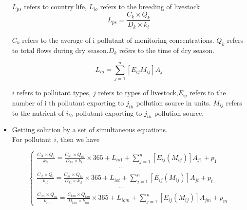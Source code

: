 \documentclass[12pt,a4paper]{article}
\begin{document}
\begin{itemize}
    $L_{ps}$ refers to country life, $L_{io}$ refers to the breeding of livestock
    \begin{equation}L_{ps}=\frac{C_k\times Q_k}{D_k\times k_i}\end{equation}
    
    $C_k$ refers to the average of i pollutant of monitoring concentrations. $Q_k$ refers to total flows during dry season.$D_k$ refers to the time of dry season.
    
    \begin{equation}L_{io}=\sum_{j=1}^{n}[E_{ij}M_{ij}]A_j\end{equation}
    
    $i$ refers to pollutant types, $j$ refers to types of livestock,$E_{ij}$ refers to the number of i th pollutant exporting to $j_{th}$ pollution source in units.
    $M_{ij}$ refers to the nutrient of $i_{th}$ pollutant exporting to $j_{th}$ pollution  source.
    
    \item Getting solution by a set of simultaneous equations.\\
    For pollutant $i$, then we have
    
    \begin{equation}
    \begin{cases}
    \displaystyle\frac{C_{i1}\times Q_1}{k_{i1}}=\displaystyle\frac{C_{k1}\times Q_{k1}}{D_{k1}\times k_{i1}}\times365+L_{io1}+\sum_{j=1}^n[E_{ij}(M_{ij})]A_{j1}+p_1\\
    \qquad\qquad\qquad\qquad \qquad\qquad\cdots\\
    \displaystyle\frac{C_{it}\times Q_t}{k_{it}}=\displaystyle\frac{C_{kt}\times Q_{kt}}{D_{kt}\times k_{it}}
    \times365+L_{iot}+\sum_{j=1}^n[E_{ij}(M_{ij})]A_{jt}+p_t\\
    \qquad\qquad\qquad\qquad \qquad\qquad\cdots\\
    \displaystyle\frac{C_{im}\times Q_m}{k_{im}}=\displaystyle\frac{C_{km}\times Q_{km}}{D_{km}\times k_{im}}
    \times365+L_{iom}+\sum_{j=1}^n[E_{ij}(M_{ij})]A_{jm}+p_m
    \end{cases}
    \end{equation}
    
\end{itemize}\par
\end{document}
